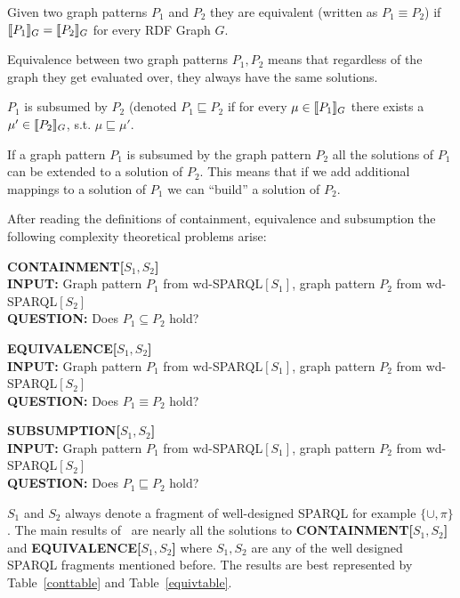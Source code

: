 \begin{definition}[Equivalence]
Given two graph patterns $P_1$ and $P_2$ they are equivalent (written as $P_1
\equiv P_2$) if $\llbracket P_1 \rrbracket_{G}  = \llbracket P_2 \rrbracket_{G} $ for every RDF Graph $G$.
\end{definition}
 Equivalence between two graph patterns $P_1,P_2$ means that regardless of the graph
 they get evaluated over, they always have the same solutions.

\begin{definition}[Subsumption]
\medskip\noindent $P_1$ is subsumed by $P_2$ (denoted $P_1 \sqsubseteq P_2$ if for every $\mu \in \llbracket P_1 \rrbracket_G$ there exists a $\mu' \in
\llbracket P_2 \rrbracket_G$, s.t. $\mu \sqsubseteq \mu'$. 
\end{definition}
If a graph pattern $P_1$ is subsumed by the graph pattern $P_2$ all the
solutions of $P_1$ can be extended to a solution of $P_2$. This means that if we
add additional mappings to a solution of $P_1$ we can ``build'' a solution of
$P_2$. 


\noindent After reading the definitions of containment, equivalence and
subsumption the following complexity theoretical problems arise:\\
\begin{framed}\noindent \textbf{CONTAINMENT[$S_1,S_2$]}\\
	\textbf{INPUT:} Graph pattern $P_1$ from wd-SPARQL$[S_1]$,
		 graph pattern $P_2$ from wd-SPARQL$[S_2]$\\
		 \textbf{QUESTION:} Does $P_1 \subseteq P_2$ hold?
\end{framed}
\begin{framed}\noindent \textbf{EQUIVALENCE[$S_1,S_2$]}\\
	\textbf{INPUT:} Graph pattern $P_1$ from wd-SPARQL$[S_1]$,
		 graph pattern $P_2$ from wd-SPARQL$[S_2]$\\
		 \textbf{QUESTION:} Does $P_1 \equiv P_2$ hold?
\end{framed}
\begin{framed}\noindent \textbf{SUBSUMPTION[$S_1,S_2$]}\\
	\textbf{INPUT:} Graph pattern $P_1$ from wd-SPARQL$[S_1]$,
		 graph pattern $P_2$ from wd-SPARQL$[S_2]$\\
		 \textbf{QUESTION:} Does $P_1 \sqsubseteq P_2$ hold?
\end{framed}
$S_1$ and $S_2$ always denote a fragment of well-designed SPARQL for example
$\{\cup,\pi\}$. The main results of~\cite{pichler2014containment} are nearly all
the solutions to \textbf{CONTAINMENT[$S_1,S_2$]} and \textbf{EQUIVALENCE[$S_1,S_2$]} where $S_1,S_2$
are any of the well designed SPARQL fragments mentioned before.
The results are best represented by Table~\ref{conttable} and Table~\ref{equivtable}.

